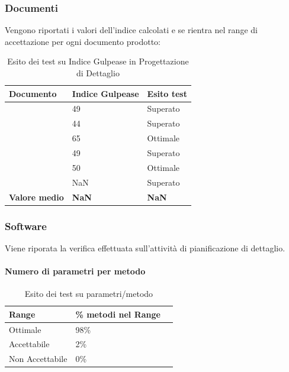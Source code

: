 \documentclass[12pt,a4paper]{article}
\begin{document}
\subsubsection{Documenti}
Vengono riportati i valori dell'indice  calcolati e se rientra nel range di accettazione per ogni documento prodotto:
			\begin{table}[H]
				\begin{center}
					\begin{tabular}{p{} p{0.3\textwidth} p{}}
						\toprule
						\textbf{Documento}   & \textbf{Indice Gulpease}	& \textbf{Esito test} \\ \midrule
						\midrule
						\NdP & 49 &  Superato \\ \midrule
						\SdF & 44 &  Superato \\ \midrule
						\AdR & 65 &  Ottimale \\ \midrule
						\PdP & 49 &  Superato \\ \midrule
						\PdQ & 50 &  Ottimale \\ \midrule
						\DP & NaN  &  Superato \\ \midrule \midrule
						\textbf{Valore medio} & \textbf{NaN}& \textbf{NaN}\\ 
						\bottomrule
						\end{tabular}
						\end{center}
						\caption{Esito dei test su Indice Gulpease in Progettazione di Dettaglio}
						\end{table}







\subsubsection{Software}
Viene riporata la verifica effettuata sull'attività di pianificazione di dettaglio. 
\paragraph{Numero di parametri per metodo}
\begin{table}[H]
	\begin{center}
		\begin{tabular}{p{} p{} p{}}
			\toprule
			\textbf{Range}   & \textbf{\% metodi nel Range}	 \\ \midrule
			\midrule
			
			Ottimale & 98\% \\ \midrule
			Accettabile & 2\%  \\ \midrule
			Non Accettabile  & 0\%  \\ \midrule
			\bottomrule
		\end{tabular}
	\end{center}
	\caption{Esito dei test su  parametri/metodo}
\end{table}
\end{document}
